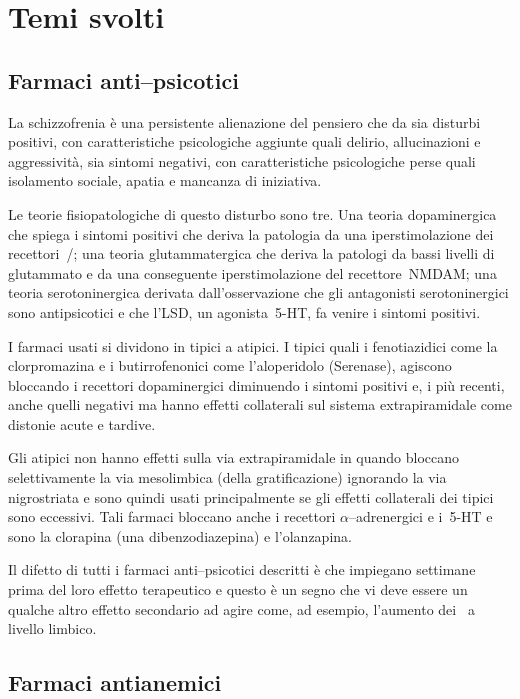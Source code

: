 \chapter{Temi svolti}

\section{Farmaci anti--psicotici}

La schizzofrenia è una persistente alienazione del pensiero che da sia disturbi positivi, con caratteristiche psicologiche aggiunte quali delirio, allucinazioni e aggressività, sia sintomi negativi, con caratteristiche psicologiche perse quali isolamento sociale, apatia e mancanza di iniziativa.

Le teorie fisiopatologiche di questo disturbo sono tre. Una teoria dopaminergica che spiega i sintomi positivi che deriva la patologia da una iperstimolazione dei recettori~/; una teoria glutammatergica che deriva la patologi da bassi livelli di glutammato e da una conseguente iperstimolazione del recettore~NMDAM; una teoria serotoninergica derivata dall'osservazione che gli antagonisti serotoninergici sono antipsicotici e che l'LSD, un agonista~5-HT, fa venire i sintomi positivi.

I farmaci usati si dividono in tipici a atipici. I tipici quali i fenotiazidici come la clorpromazina e i butirrofenonici come l'aloperidolo (Serenase), agiscono bloccando i recettori dopaminergici diminuendo i sintomi positivi e, i più recenti, anche quelli negativi ma hanno effetti collaterali sul sistema extrapiramidale come distonie acute e tardive. 

Gli atipici non hanno effetti sulla via extrapiramidale in quando bloccano selettivamente la via mesolimbica (della gratificazione) ignorando la via nigrostriata e sono quindi usati principalmente se gli effetti collaterali dei tipici sono eccessivi. Tali farmaci bloccano anche i recettori $\alpha$--adrenergici e i~5-HT e sono la clorapina (una dibenzodiazepina) e l'olanzapina.

Il difetto di tutti i farmaci anti--psicotici descritti è che impiegano settimane prima del loro effetto terapeutico e questo è un segno che vi deve essere un qualche altro effetto secondario ad agire come, ad esempio, l'aumento dei~ a livello limbico.

\section{Farmaci antianemici}

